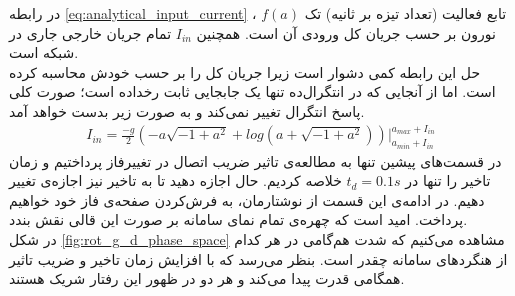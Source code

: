 در رابطه \ref{eq:analytical_input_current} ، $f(a)$ تابع فعالیت (تعداد تیزه بر ثانیه) تک نورون بر حسب جریان کل ورودی آن است. همچنین $I_{in}$ تمام جریان خارجی جاری در شبکه است.\\
حل این رابطه کمی دشوار است زیرا جریان کل را بر حسب خودش محاسبه کرده است. اما از آنجایی که در انتگرال‌ده تنها یک جابجایی ثابت رخداده است؛ صورت کلی پاسخ انتگرال تغییر نمی‌کند و به صورت زیر بدست خواهد آمد.
\begin{align}
	I_{in} = \frac{-g}{2} (-a \sqrt{-1 + a^2} + log(a + \sqrt{-1 + a^2})) \Big|_{a_{min} + I_{in}}^{a_{max} + I_{in}}
\end{align}
در قسمت‌های پیشین تنها به مطالعه‌ی تاثیر ضریب اتصال در تغییرفاز پرداختیم و زمان تاخیر را تنها در $t_d = 0.1 s$ خلاصه کردیم. حال اجازه دهید تا به تاخیر نیز اجازه‌ی تغییر دهیم. در ادامه‌ی این قسمت از نوشتارمان، به فرش‌کردن صفحه‌ی فاز خود خواهیم پرداخت. امید است که چهره‌ی تمام نمای سامانه‌ بر صورت این قالی نقش بندد.\\


در شکل \ref{fig:rot_g_d_phase_space} مشاهده می‌کنیم که شدت هم‌گامی در هر کدام از هنگردهای سامانه چقدر است. بنظر می‌رسد که با افزایش زمان تاخیر و ضریب تاثیر همگامی قدرت پیدا می‌کند و هر دو در ظهور این رفتار شریک هستند.
